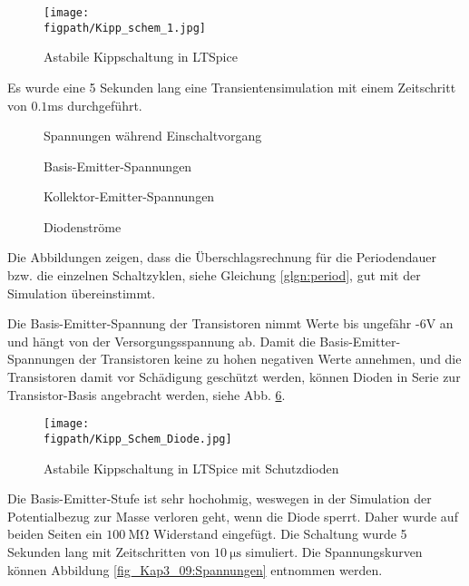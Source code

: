 \begin{figure}[H]
    \centering
    \texttt{[image: \\figpath/Kipp\_schem\_1.jpg]}
    \caption{Astabile Kippschaltung in LTSpice}
    \label{fig_Kap3_03:LTSpice_Schem_1}
\end{figure}

Es wurde eine 5 Sekunden lang eine Transientensimulation mit einem Zeitschritt von $0.1$ms durchgeführt.

\begin{figure}[H]
	\centering \small
	\scalebox{0.9}{}
	\caption{Spannungen während Einschaltvorgang}
	\label{fig_Kap3_04:Einschalt}
\end{figure}

\begin{figure}[H]
	\centering \small
	\scalebox{0.9}{}
	\caption{Basis-Emitter-Spannungen}
	\label{fig_Kap3_05:U_BE}
\end{figure}

\begin{figure}[H]
	\centering \small
	\scalebox{0.9}{}
	\caption{Kollektor-Emitter-Spannungen}
	\label{fig_Kap3_06:U_CE}
\end{figure}

\begin{figure}[H]
	\centering \small
	\scalebox{0.9}{}
	\caption{Diodenströme}
	\label{fig_Kap3_07:I_D}
\end{figure}

Die Abbildungen zeigen, dass die Überschlagsrechnung für die Periodendauer bzw. die einzelnen Schaltzyklen, siehe Gleichung \ref{glgn:period}, gut mit der Simulation übereinstimmt.

Die Basis-Emitter-Spannung der Transistoren nimmt Werte bis ungefähr -6V an und hängt von der Versorgungsspannung ab. Damit die Basis-Emitter-Spannungen der Transistoren keine zu hohen negativen Werte annehmen, und die Transistoren damit vor Schädigung geschützt werden, können Dioden in Serie zur Transistor-Basis angebracht werden, siehe Abb. \ref{fig_Kap3_08:LTSpice_Schem_2}.

\begin{figure}[H]
    \centering
    \texttt{[image: \\figpath/Kipp\_Schem\_Diode.jpg]}
    \caption{Astabile Kippschaltung in LTSpice mit Schutzdioden}
    \label{fig_Kap3_08:LTSpice_Schem_2}
\end{figure}

Die Basis-Emitter-Stufe ist sehr hochohmig, weswegen in der Simulation der Potentialbezug zur Masse verloren geht, wenn die Diode sperrt. Daher wurde auf beiden Seiten ein $\SI{100}{\mega\ohm}$ Widerstand eingefügt. Die Schaltung wurde 5 Sekunden lang mit Zeitschritten von $\SI{10}{\micro\second}$ simuliert. Die Spannungskurven können Abbildung \ref{fig_Kap3_09:Spannungen} entnommen werden.

